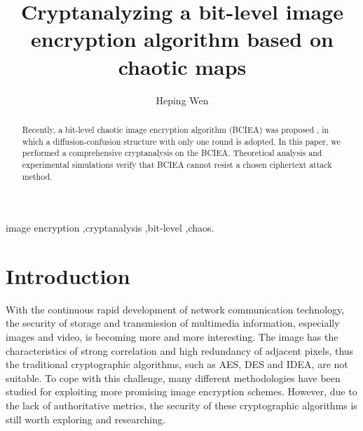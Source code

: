 \documentclass[final,3p,times,twocolumn]{elsarticle}
\begin{document}
\begin{frontmatter}

\title{Cryptanalyzing a bit-level image encryption algorithm based on chaotic maps}

\author[zsi,uestc]{Heping Wen}




\address[zsi]{School of Electronic and Information Engineering, University of Electronic Science and Technology of China, Zhongshan Institute, \\ Zhongshan 528402, China}

\address[uestc]{School of Information and Communication Engineering, University of Electronic Science and Technology of China, Chengdu 611731, China}

\begin{abstract}

Recently, a bit-level chaotic image encryption algorithm (BCIEA) was proposed \cite{LuX2016OLE}, in which a diffusion-confusion structure with only one round is adopted. In this paper, we performed a comprehensive cryptanalysis on the BCIEA. Theoretical analysis and experimental simulations verify that BCIEA cannot resist a chosen ciphertext attack method.


\end{abstract}
\begin{keyword}
image encryption \sep cryptanalysis \sep bit-level \sep chaos.
\end{keyword}
\end{frontmatter}

\section{Introduction}
\label{sec:intro}

With the continuous rapid development of network communication technology, the security of storage and transmission of multimedia information, especially images and video, is becoming more and more interesting.
The image has the characteristics of strong correlation and high redundancy of adjacent pixels, thus the traditional cryptographic algorithms, such as AES, DES and IDEA, are not suitable.
To cope with this challenge, many different methodologies have been studied for exploiting more promising image encryption schemes. 
However, due to the lack of authoritative metrics, the security of these cryptographic algorithms is still worth exploring and researching.
\end{document}
